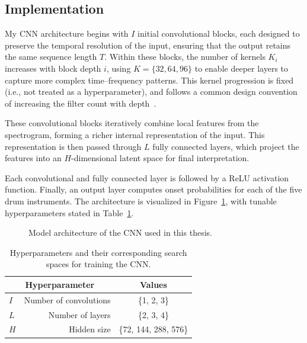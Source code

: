 \subsection{Implementation}

My \gls{CNN} architecture begins with $I$ initial convolutional blocks, each designed to preserve the temporal resolution of the input, ensuring that the output retains the same sequence length $T$. Within these blocks, the number of kernels $K_i$ increases with block depth $i$, using $K = \{32, 64, 96\}$ to enable deeper layers to capture more complex time–frequency patterns. This kernel progression is fixed (i.e., not treated as a hyperparameter), and follows a common design convention of increasing the filter count with depth~\cite{simonyan2014very}.

These convolutional blocks iteratively combine local features from the spectrogram, forming a richer internal representation of the input. This representation is then passed through $L$ fully connected layers, which project the features into an $H$-dimensional latent space for final interpretation. 

Each convolutional and fully connected layer is followed by a \gls{ReLU} activation function. Finally, an output layer computes onset probabilities for each of the five drum instruments. The architecture is visualized in Figure~\ref{CNNFigure}, with tunable hyperparameters stated in Table~\ref{CNNHyperparams}.

\begin{figure}[H]
    \centering
    
    \caption{Model architecture of the \acrlong{CNN} used in this thesis.}
    \label{CNNFigure}
\end{figure}

\begin{table}[H]
    \centering
    \begin{tabular}{lr|c}
        \multicolumn{2}{c|}{Hyperparameter} & Values       \\
        \hline
        $I$ & Number of convolutions & \{1, 2, 3\}\\
        $L$ & Number of layers      & \{2, 3, 4\} \\
        $H$ & Hidden size      & \{72, 144, 288, 576\} \\
    \end{tabular}
    \caption{Hyperparameters and their corresponding search spaces for training the \acrlong{CNN}.}
    \label{CNNHyperparams}
\end{table}

